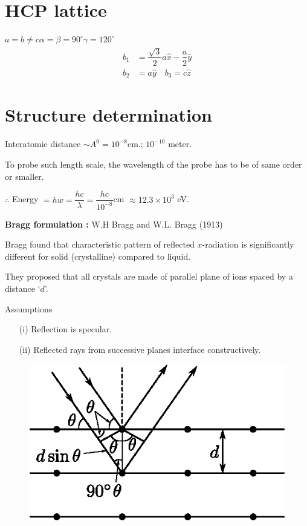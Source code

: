 \section*{HCP lattice}
$a=b\neq c$\quad $\alpha=\beta=90^{\circ}$\quad $\gamma=120^{\circ}$
\begin{align*}
b_{1} &= \dfrac{\sqrt{3}}{2}a\widehat{x}-\dfrac{a}{2}\widehat{y}\\
b_{2} &= a\widehat{y}\quad b_{3}=c\widehat{z}
\end{align*}

\section*{Structure determination}

Interatomic distance $\sim A^{0}=10^{-8}$cm.; $10^{-10}$ meter.

To probe such length scale, the wavelength of the probe has to be of same order or smaller.

$\therefore$ Energy $=hw=\dfrac{hc}{\lambda}=\dfrac{hc}{10^{-8}}$cm $\approx 12.3\times 10^{3}$ eV.

\medskip
\noindent
{\bf Bragg formulation :} W.H Bragg and W.L. Bragg (1913)

Bragg found that characteristic pattern of reflected $x$-radiation is significantly different for solid (crystalline) compared to liquid.

They proposed that all crystals are made of parallel plane of ions spaced by a distance `$d$'.

Assumptions
\begin{itemize}
\item[(i)] Reflection is specular.

\item[(ii)] Reflected rays from successive planes interface constructively.
\end{itemize}
\begin{figure}[H]
\centering
\includegraphics{images/lecture14/fig3.eps}
\end{figure}

